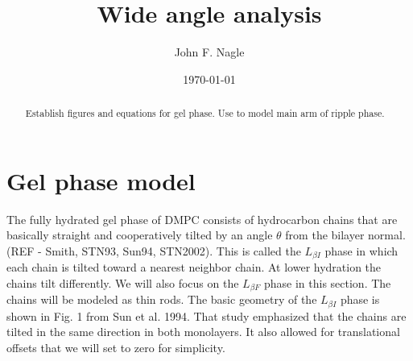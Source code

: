 \documentclass[
 preprint,
 showkeys, 
 amsmath,
 amssymb,
 aps,
]{revtex4-1}
\begin{document}

\title{Wide angle analysis}
\author{John F. Nagle}

\date{\today}

\begin{abstract}
Establish figures and equations for gel phase.  Use to model main arm of ripple phase.
\end{abstract}
\maketitle

\section{Gel phase model}
The fully hydrated gel phase of DMPC consists of hydrocarbon chains that are basically straight and cooperatively tilted by an angle $\theta$ from the bilayer normal. (REF - Smith, STN93, Sun94, STN2002). This is called the $L_{{\beta}I}$ phase in which each chain is tilted toward a nearest neighbor chain. At lower hydration the chains tilt differently. We will also focus on the $L_{{\beta}F}$ phase in this section.  The chains will be modeled as thin rods.  The basic geometry of the $L_{{\beta}I}$ phase is shown in Fig. 1 from Sun et al. 1994.  That study emphasized that the chains are tilted in the same direction in both monolayers. It also allowed for translational offsets that we will set to zero for simplicity.  
\end{document}
